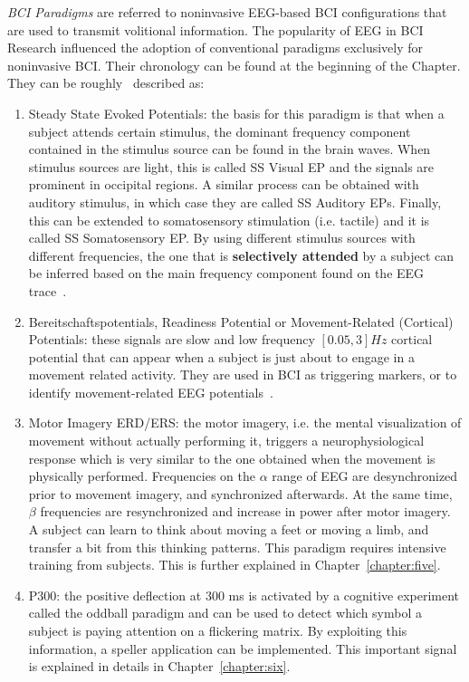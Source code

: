 \textit{BCI Paradigms} are referred to noninvasive EEG-based BCI configurations that are used to transmit volitional information.  The popularity of EEG in BCI Research influenced the adoption of conventional paradigms exclusively for noninvasive BCI.   Their chronology can be found at the beginning of the Chapter. They can be roughly~\cite{Chaudhary2016} described as:

\begin{enumerate}
\item Steady State Evoked Potentials: the basis for this paradigm is that when a subject attends certain stimulus, the dominant frequency component contained in the stimulus source can be found in the brain waves.  When stimulus sources are light, this is called SS Visual EP and the signals are prominent in occipital regions.  A similar process can be obtained with auditory stimulus, in which case they are called SS Auditory EPs.  Finally, this can be extended to somatosensory stimulation (i.e. tactile) and it is called SS Somatosensory EP.  By using different stimulus sources with different frequencies, the one that is \textbf{selectively attended} by a subject can be inferred based on the main frequency component found on the EEG trace~\cite{Nam2010}.
\item Bereitschaftspotentials, Readiness Potential or Movement-Related (Cortical) Potentials: these signals are slow and low frequency $\left[0.05, 3\right] \si{Hz}$ cortical potential that can appear when a subject is just about to engage in a movement related activity.  They are used in BCI as triggering markers, or to identify movement-related EEG potentials~\cite{c52}.
\item Motor Imagery ERD/ERS: the motor imagery, i.e. the mental visualization of movement without actually performing it, triggers a neurophysiological response which is very similar to the one obtained when the movement is physically performed. Frequencies on the $\alpha$ range of EEG are desynchronized prior to movement imagery, and synchronized afterwards. At the same time, $\beta$ frequencies are resynchronized and increase in power after motor imagery. A subject can learn to think about moving a feet or moving a limb, and transfer a bit from this thinking patterns. This paradigm requires intensive training from subjects.  This is further explained in Chapter~\ref{chapter:five}.
\item P300: the positive deflection at 300 \si{\ms} is activated by a cognitive experiment called the oddball paradigm and can be used to detect which symbol a subject is paying attention on a flickering matrix.  By exploiting this information, a speller application can be implemented. This important signal is explained in details in Chapter~\ref{chapter:six}.

\end{enumerate}
